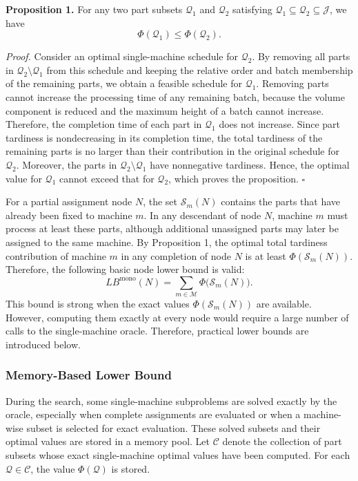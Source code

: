 \documentclass[letterpaper, 10 pt, conference]{ieeeconf}  %
\newcounter{proposition}
\begin{document}
\textbf{Proposition 1.}
For any two part subsets $\mathcal{Q}_1$ and $\mathcal{Q}_2$ satisfying
$\mathcal{Q}_1\subseteq \mathcal{Q}_2\subseteq\mathcal{J}$, we have
\[
\Phi(\mathcal{Q}_1)\le \Phi(\mathcal{Q}_2).
\]

\textit{Proof.}
Consider an optimal single-machine schedule for $\mathcal{Q}_2$. By removing
all parts in $\mathcal{Q}_2\setminus\mathcal{Q}_1$ from this schedule and
keeping the relative order and batch membership of the remaining parts, we
obtain a feasible schedule for $\mathcal{Q}_1$. Removing parts cannot
increase the processing time of any remaining batch, because the volume
component is reduced and the maximum height of a batch cannot increase.
Therefore, the completion time of each part in $\mathcal{Q}_1$ does not
increase. Since part tardiness is nondecreasing in its completion time, the
total tardiness of the remaining parts is no larger than their contribution
in the original schedule for $\mathcal{Q}_2$. Moreover, the parts in
$\mathcal{Q}_2\setminus\mathcal{Q}_1$ have nonnegative tardiness. Hence,
the optimal value for $\mathcal{Q}_1$ cannot exceed that for
$\mathcal{Q}_2$, which proves the proposition.
\hfill $\square$

For a partial assignment node $N$, the set $\mathcal{S}_m(N)$ contains the
parts that have already been fixed to machine $m$. In any descendant of
node $N$, machine $m$ must process at least these parts, although additional
unassigned parts may later be assigned to the same machine. By Proposition
1, the optimal total tardiness contribution of machine $m$ in any completion
of node $N$ is at least $\Phi(\mathcal{S}_m(N))$. Therefore, the following
basic node lower bound is valid:
\[
LB^{\mathrm{mono}}(N)
=
\sum_{m\in\mathcal{M}}
\Phi\bigl(\mathcal{S}_m(N)\bigr).
\]
This bound is strong when the exact values
$\Phi(\mathcal{S}_m(N))$ are available. However, computing them exactly at
every node would require a large number of calls to the single-machine
oracle. Therefore, practical lower bounds are introduced below.

\subsubsection{Memory-Based Lower Bound}

During the search, some single-machine subproblems are solved exactly by
the oracle, especially when complete assignments are evaluated or when a
machine-wise subset is selected for exact evaluation. These solved subsets
and their optimal values are stored in a memory pool. Let $\mathcal{C}$
denote the collection of part subsets whose exact single-machine optimal
values have been computed. For each $\mathcal{Q}\in\mathcal{C}$, the value
$\Phi(\mathcal{Q})$ is stored.
\end{document}
